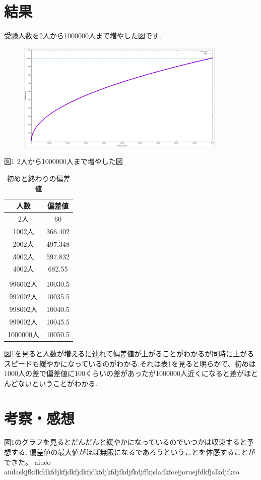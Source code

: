 \documentclass[dvipdfmx]{jsarticle}
\begin{document}
\section{結果}
受験人数を2人から1000000人まで増やした図です.
\begin{figure}[H]
  \centering
  \includegraphics[width=10cm]{image/hensati2.png}
\end{figure}
\begin{center}
  図1 2人から1000000人まで増やした図
\end{center}

\begin{table}[H]
  \begin{center}
    \caption{初めと終わりの偏差値}
    \begin{tabular}{c|c}
      人数 & 偏差値 \\ \hline \hline
      2人 & 60 \\ \hline
      1002人 & 366.402 \\ \hline
      2002人 & 497.348 \\ \hline
      3002人 & 597.832 \\ \hline
      4002人 & 682.55 \\ \hline
            &        \\ \hline
      996002人 & 10030.5 \\ \hline
      997002人 & 10035.5 \\ \hline
      998002人 & 10040.5 \\ \hline
      999002人 & 10045.5 \\ \hline
      1000000人 & 10050.5 \\ \hline
    \end{tabular}
  \end{center}
\end{table}
図1を見ると人数が増えるに連れて偏差値が上がることがわかるが同時に上がるスピードも緩やかになっているのがわかる.それは表1を見ると明らかで、初めは1000人の差で偏差値に100くらいの差があったが1000000人近くになると差がほとんどないということがわかる.

\section{考察・感想}
図1のグラフを見るとだんだんと緩やかになっているのでいつかは収束すると予想する.
偏差値の最大値がほぼ無限になるであろうということを体感することができた。
aiueo
aiulaskjfkdkfdkfdjkfjdkfjdkfjdkfdjkfdjfkdjfkdjffkjsladkfoeijoruejfdkfjalkdjfkeo
\end{document}
